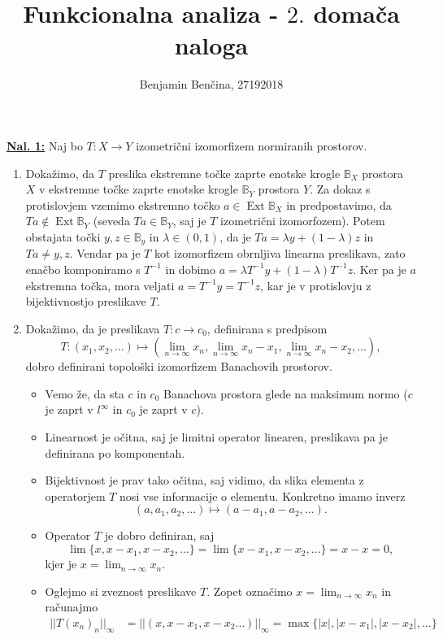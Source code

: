 \documentclass[a4paper, 12pt]{article}
\title{Funkcionalna analiza - $2.$ domača naloga}
\author{Benjamin Benčina, 27192018}
\DeclareMathOperator{\Ext}{Ext}
\newcommand{\B}{\mathbb{B}}
\begin{document}
\maketitle

\underline{\textbf{Nal. 1:}}
Naj bo $T\colon X \to Y$ izometrični izomorfizem normiranih prostorov.
\begin{enumerate}[label=(\alph*)]
	\item Dokažimo, da $T$ preslika ekstremne točke zaprte enotske krogle $\B_X$ prostora $X$ v ekstremne točke zaprte enotske krogle $\B_Y$ prostora $Y$. Za dokaz s protislovjem vzemimo ekstremno točko $a \in \Ext\B_X$ in predpostavimo, da $Ta \notin \Ext\B_Y$ (seveda $Ta \in \B_Y$, saj je $T$ izometrični izomorfozem). Potem obstajata točki $y,z \in \B_y$ in $\lambda \in (0,1)$, da je $Ta = \lambda y + (1 - \lambda) z$ in $Ta \neq y, z$. Vendar pa je $T$ kot izomorfizem obrnljiva linearna preslikava, zato enačbo komponiramo s $T^{-1}$ in dobimo $a = \lambda T^{-1}y + (1 - \lambda) T^{-1}z$. Ker pa je $a$ ekstremna točka, mora veljati $a = T^{-1}y = T^{-1}z$, kar je v protislovju z bijektivnostjo preslikave $T$.
	\item Dokažimo, da je preslikava $T\colon c \to c_0$, definirana s predpisom
	\[
	T\colon (x_1, x_2, \dots) \mapsto (\lim_{n\to\infty} x_n, \lim_{n\to\infty} x_n - x_1, \lim_{n\to\infty} x_n - x_2, \dots),
	\]
	dobro definirani topološki izomorfizem Banachovih prostorov.
	\begin{itemize}
		\item Vemo že, da sta $c$ in $c_0$ Banachova prostora glede na maksimum normo ($c$ je zaprt v $l^\infty$ in $c_0$ je zaprt v $c$).
		\item Linearnost je očitna, saj je limitni operator linearen, preslikava pa je definirana po komponentah.
		\item Bijektivnost je prav tako očitna, saj vidimo, da slika elementa z operatorjem $T$ nosi vse informacije o elementu. Konkretno imamo inverz
		\[
		(a, a_1, a_2, \dots) \mapsto (a - a_1, a - a_2, \dots).
		\]
		\item Operator $T$ je dobro definiran, saj
		\[
		\lim_{}\lbrace x, x - x_1, x - x_2, \dots \rbrace = \lim_{}\lbrace x - x_1, x - x_2, \dots \rbrace = x - x = 0,
		\]
		kjer je $x = \lim_{n\to\infty} x_n$.
		\item Oglejmo si zveznost preslikave $T$. Zopet označimo $x = \lim_{n\to\infty} x_n$ in računajmo
		\begin{align*}
		||T(x_n)_n||_{\infty} &= || (x, x - x_1, x - x_2 \dots) ||_\infty = \max\lbrace |x|, |x - x_1|, |x - x_2|, \dots \rbrace \\

\end{align*}
\end{itemize}
\end{enumerate}
\end{document}
